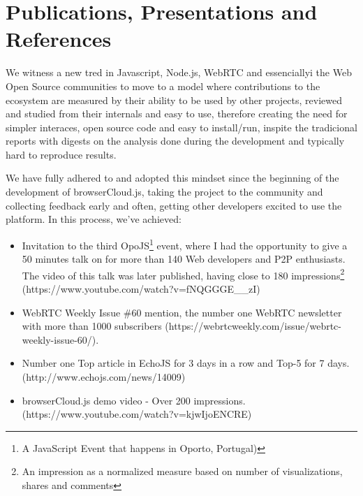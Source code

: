 \section{Publications, Presentations and References}

We witness a new tred in Javascript, Node.js, WebRTC and essenciallyi the Web Open Source communities to move to a model where contributions to the ecosystem are measured by their ability to be used by other projects, reviewed and studied from their internals and easy to use, therefore creating the need for simpler interaces, open source code and easy to install/run, inspite the tradicional reports with digests on the analysis done during the development and typically hard to reproduce results.

We have fully adhered to and adopted this mindset since the beginning of the development of browserCloud.js, taking the project to the community and collecting feedback early and often, getting other developers excited to use the platform. In this process, we've achieved:

\begin{itemize}
    \item Invitation to the third OpoJS\footnote{A JavaScript Event that happens in Oporto, Portugal)} event, where I had the opportunity to give a 50 minutes talk on for more than 140 Web developers and P2P enthusiasts. The video of this talk was later published, having close to 180 impressions\footnote{An impression as a normalized measure based on number of visualizations, shares and comments} (https://www.youtube.com/watch?v=fNQGGGE\_\_zI)
    \item WebRTC Weekly Issue \#60 mention, the number one WebRTC newsletter with more than 1000 subscribers (https://webrtcweekly.com/issue/webrtc-weekly-issue-60/).
    \item Number one Top article in EchoJS for 3 days in a row and Top-5 for 7 days. (http://www.echojs.com/news/14009)
    \item browserCloud.js demo video - Over 200 impressions. (https://www.youtube.com/watch?v=kjwIjoENCRE)
\end{itemize}
